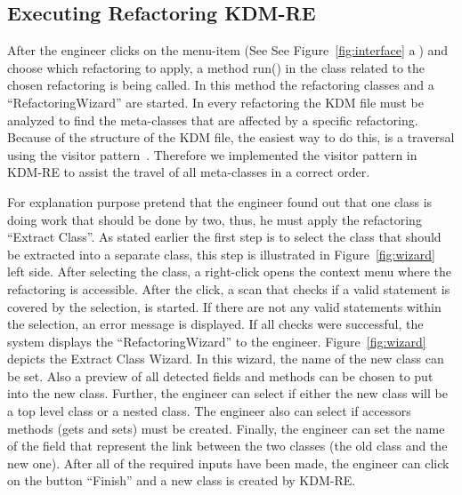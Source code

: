 \subsection{Executing Refactoring KDM-RE}

After the engineer clicks on the menu-item (See See Figure~\ref{fig:interface} \textcircled{a}) and choose which refactoring to apply, a method run() in the class related to the chosen refactoring is being called. In this method the refactoring classes and a ``RefactoringWizard'' are started. In every refactoring the KDM file must be analyzed to find the meta-classes that are affected by a specific refactoring. Because of the structure of the KDM file, the easiest way to do this, is a traversal using the visitor pattern~\cite{gamma}. Therefore we implemented the visitor pattern in KDM-RE to assist the travel of all meta-classes in a correct order.

For explanation purpose pretend that the engineer found out that one class is doing work that should be done by two, thus, he must apply the refactoring ``Extract Class''. As stated earlier the first step is to select the class that should be extracted into a separate class, this step is illustrated in Figure~\ref{fig:wizard} left side. After selecting the class, a right-click opens the context menu where the refactoring is accessible. After the click, a scan that checks if a valid statement is covered by the selection, is started. If there are not any valid statements within the selection, an error message is displayed. If all checks were successful, the system displays the ``RefactoringWizard'' to the engineer. Figure~\ref{fig:wizard} depicts the Extract Class Wizard. In this wizard, the name of the new class can be set. Also a preview of all detected fields and methods can be chosen to put into the new class. Further, the engineer can select if either the new class will be a top level class or a nested class. The engineer also can select if accessors methods (gets and sets) must be created. Finally, the engineer can set the name of the field that represent the link between the two classes (the old class and the new one). After all of the required inputs have been made, the engineer can click on the button ``Finish'' and a new class is created by KDM-RE.

